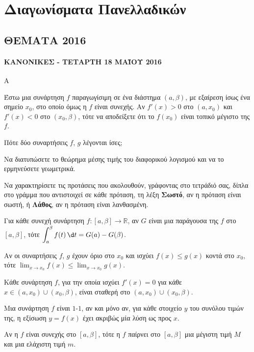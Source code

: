 \section{Διαγωνίσματα Πανελλαδικών}
\subsection{ΘΕΜΑΤΑ 2016}
\paragraph{ΚΑΝΟΝΙΚΕΣ - ΤΕΤΑΡΤΗ 18 ΜΑΪΟΥ 2016}
\begin{thema}{Α}
\begin{erwthma}
    \item Έστω μια συνάρτηση $f$ παραγωγίσιμη σε ένα διάστημα $(a, \beta)$, με εξαίρεση ίσως ένα σημείο $x_0$, στο οποίο όμως η $f$ είναι συνεχής. Αν $f'(x) > 0$ στο $(a, x_0)$ και $f'(x) < 0$ στο $(x_0, \beta)$, τότε να αποδείξετε ότι το $f(x_0)$ είναι τοπικό μέγιστο της $f$. 
    \item Πότε δύο συναρτήσεις $f$, $g$ λέγονται ίσες; 
    \item Να διατυπώσετε το θεώρημα μέσης τιμής του διαφορικού λογισμού και να το ερμηνεύσετε γεωμετρικά. 
    \item Να χαρακτηρίσετε τις προτάσεις που ακολουθούν, γράφοντας στο τετράδιό σας, δίπλα στο γράμμα που αντιστοιχεί σε κάθε πρόταση, τη λέξη \textbf{Σωστό}, αν η πρόταση είναι σωστή, ή \textbf{Λάθος}, αν η πρόταση είναι λανθασμένη.
    \begin{alist}
        \item Για κάθε συνεχή συνάρτηση $f : [a, \beta] \to \mathbb{R}$, αν $G$ είναι μια παράγουσα της $f$ στο $[a, \beta]$, τότε $\displaystyle\int_{a}^{\beta} f(t)\,\d t = G(a) - G(\beta)$.
        \item Αν οι συναρτήσεις $f$, $g$ έχουν όριο στο $x_0$ και ισχύει $f(x) \leq g(x)$ κοντά στο $x_0$, τότε $\displaystyle\lim_{x \to x_0} f(x) \leq \lim_{x \to x_0} g(x)$.
        \item Κάθε συνάρτηση $f$, για την οποία ισχύει $f'(x) = 0$ για κάθε $x \in (a, x_0) \cup (x_0, \beta)$, είναι σταθερή στο $(a, x_0) \cup (x_0, \beta)$.
        \item Μια συνάρτηση $f$ είναι $1$-$1$, αν και μόνο αν, για κάθε στοιχείο $y$ του συνόλου τιμών της, η εξίσωση $y = f(x)$ έχει ακριβώς μία λύση ως προς $x$.
        \item Αν η $f$ είναι συνεχής στο $[a, \beta]$, τότε η $f$ παίρνει στο $[a, \beta]$ μια μέγιστη τιμή $M$ και μια ελάχιστη τιμή $m$.
    \end{alist} 
\end{erwthma}
\end{thema}

